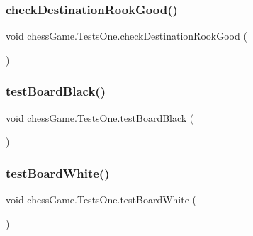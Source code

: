 \hypertarget{classchess_game_1_1_tests_one_aa9306477b5a3dcda3a5fcdf26cae704e}{}\label{classchess_game_1_1_tests_one_aa9306477b5a3dcda3a5fcdf26cae704e} 
\subsubsection{\texorpdfstring{check\+Destination\+Rook\+Good()}{checkDestinationRookGood()}}
{\footnotesize\ttfamily void chess\+Game.\+Tests\+One.\+check\+Destination\+Rook\+Good (\begin{DoxyParamCaption}{ }\end{DoxyParamCaption})}

\hypertarget{classchess_game_1_1_tests_one_aa5af1f8650fba37708180074d50f9d12}{}\label{classchess_game_1_1_tests_one_aa5af1f8650fba37708180074d50f9d12} 
\subsubsection{\texorpdfstring{test\+Board\+Black()}{testBoardBlack()}}
{\footnotesize\ttfamily void chess\+Game.\+Tests\+One.\+test\+Board\+Black (\begin{DoxyParamCaption}{ }\end{DoxyParamCaption})}

\hypertarget{classchess_game_1_1_tests_one_a5ad1d4e10e2d9f7dd68ab8e1f98d30df}{}\label{classchess_game_1_1_tests_one_a5ad1d4e10e2d9f7dd68ab8e1f98d30df} 
\subsubsection{\texorpdfstring{test\+Board\+White()}{testBoardWhite()}}
{\footnotesize\ttfamily void chess\+Game.\+Tests\+One.\+test\+Board\+White (\begin{DoxyParamCaption}{ }\end{DoxyParamCaption})}

